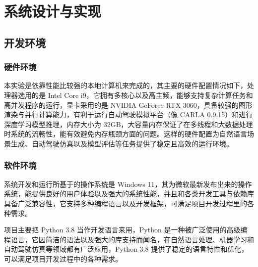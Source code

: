
\chapter{系统设计与实现}
\section{开发环境}
\subsection{硬件环境}
本实验是依靠性能比较强的本地计算机来完成的，其主要的硬件配置情况如下，处理器选用的是 Intel Core i9，它拥有多核心以及高主频，能够支持复杂计算任务和高并发程序的运行，显卡采用的是 NVIDIA GeForce RTX 3060，具备较强的图形渲染与并行计算能力，有利于运行自动驾驶模拟平台（像 CARLA 0.9.15）和进行深度学习模型推理，内存大小为 32GB，大容量内存保证了在多线程和大数据处理时系统的流畅性，能有效避免内存瓶颈方面的问题。这样的硬件配置为自然语言场景生成、自动驾驶仿真以及模型评估等任务提供了稳定且高效的运行环境。

\subsection{软件环境}
系统开发和运行所基于的操作系统是 Windows 11，其为微软最新发布出来的操作系统，能提供良好的用户体验以及强大的系统性能，并且和各类开发工具与依赖库具备广泛兼容性，它支持多种编程语言以及开发框架，可满足项目开发过程里的各种需求。

项目主要把 Python 3.8 当作开发语言来用，Python 是一种被广泛使用的高级编程语言，它因简洁的语法以及强大的库支持而闻名，在自然语言处理、机器学习和自动驾驶仿真等领域都有广泛应用，Python 3.8 提供了稳定的语言特性和优化，可以满足项目开发过程中的各种需求。


